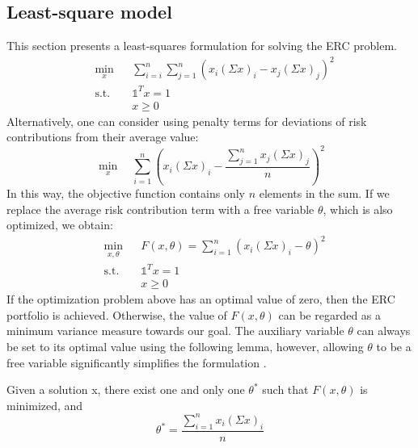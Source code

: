 \subsection{Least-square model}
This section presents a least-squares formulation for solving the ERC problem.
\begin{equation}
\begin{aligned}
& \min_x
&& \sum_{i=i}^n \sum_{j=1}^{n}\left(x_i(\Sigma x)_i - x_j(\Sigma x)_j\right)^2\\
& \text{s.t.}
&&\mathds{1}^T x =1\\
&&&x \geq 0
\end{aligned}
\end{equation}
Alternatively, one can consider using penalty terms for deviations of risk contributions from their average value:
\begin{equation}\label{eq:ls1} 
\min_x \hspace{1em}\sum_{i=1}^{n}\left(x_i(\Sigma x)_i - \frac{\sum_{j=1}^{n} x_j(\Sigma x)_j}{n}\right)^2
\end{equation}
In this way, the objective function contains only $n$ elements in the sum. If we replace the average risk contribution term with a free variable $\theta$, which is also optimized, we obtain:
\begin{equation}\label{eq:ls}
\begin{aligned}
& \min_{x,\theta}
&& F(x,\theta) = \sum_{i=1}^n (x_i(\Sigma x)_i - \theta)^2\\
& \text{s.t.}
&&\mathds{1}^T x =1\\
&&&x \geq 0
\end{aligned}
\end{equation}
If the optimization problem above has an optimal value of zero, then the ERC portfolio is achieved. Otherwise, the value of $F(x,\theta)$ can be regarded as a minimum variance measure towards our goal. The auxiliary variable $\theta$ can always be set to its optimal value using the following lemma, however, allowing $\theta$ to be a free variable significantly simplifies the formulation \cite{tutuncu}. 
\begin{lemma} Given a solution x, there exist one and only one $\theta^*$ such that $F(x,\theta)$ is minimized, and
\begin{equation}
\theta^* = \frac{\sum_{i=1}^n x_i(\Sigma x)_i}{n}
\end{equation}
\end{lemma}


